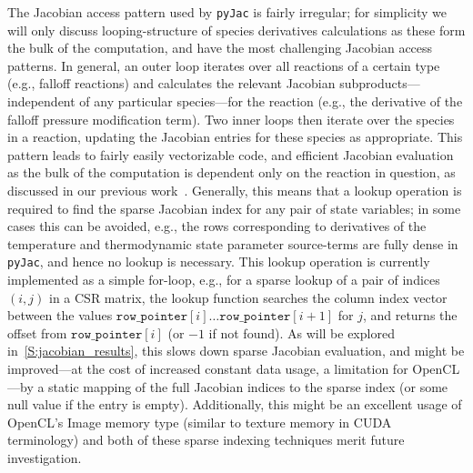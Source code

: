 \documentclass[12pt,number,sort&compress,preprint]{elsarticle}
\begin{document}
The Jacobian access pattern used by \texttt{pyJac} is fairly irregular; for simplicity we will only discuss looping-structure of species derivatives calculations as these form the bulk of the computation, and have the most challenging Jacobian access patterns.
In general, an outer loop iterates over all reactions of a certain type (e.g., falloff reactions) and calculates the relevant Jacobian subproducts---independent of any particular species---for the reaction (e.g., the derivative of the falloff pressure modification term).
Two inner loops then iterate over the species in a reaction, updating the Jacobian entries for these species as appropriate.
This pattern leads to fairly easily vectorizable code, and efficient Jacobian evaluation as the bulk of the computation is dependent only on the reaction in question, as discussed in our previous work~\cite{Niemeyer:2016aa}.
Generally, this means that a lookup operation is required to find the sparse Jacobian index for any pair of state variables; in some cases this can be avoided, e.g., the rows corresponding to derivatives of the temperature and thermodynamic state parameter source-terms are fully dense in \texttt{pyJac}, and hence no lookup is necessary.
This lookup operation is currently implemented as a simple for-loop, e.g., for a sparse lookup of a pair of indices $(i, j)$ in a CSR matrix, the lookup function searches the column index vector between the values $\texttt{row\_pointer}[i] \ldots \texttt{row\_pointer}[i + 1]$ for $j$, and returns the offset from $\texttt{row\_pointer}[i]$ (or $\num{-1}$ if not found).
As will be explored in~\cref{S:jacobian_results}, this slows down sparse Jacobian evaluation, and might be improved---at the cost of increased constant data usage, a limitation for OpenCL---by a static mapping of the full Jacobian indices to the sparse index (or some null value if the entry is empty).
Additionally, this might be an excellent usage of OpenCL's Image memory type (similar to texture memory in CUDA terminology) and both of these sparse indexing techniques merit future investigation.
\end{document}
